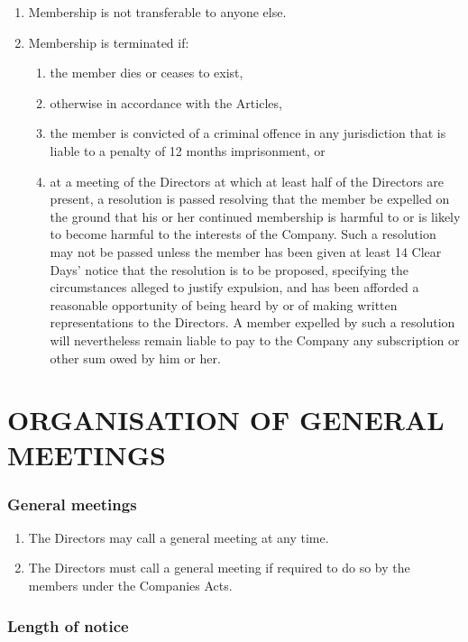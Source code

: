 \documentclass[a4paper,12pt]{article}
\begin{document}
\begin{enumerate}
  \item Membership is not transferable to anyone else.\footnotemark[\ref{membership1}]
  \item Membership is terminated if:
  \begin{enumerate}
    \item the member dies or ceases to exist,\footnotemark[\ref{membership1}]
    \item otherwise in accordance with the Articles,\footnotemark[\ref{membership1}]
    \item the member is convicted of a criminal offence in any jurisdiction that is liable to a penalty of 12 months imprisonment, or
    \item at a meeting of the Directors at which at least half of the Directors are present, a resolution is passed resolving that the member be expelled on the ground that his or her continued membership is harmful to or is likely to become harmful to the interests of the Company. Such a resolution may not be passed unless the member has been given at least 14 Clear Days' notice that the resolution is to be proposed, specifying the circumstances alleged to justify expulsion, and has been afforded a reasonable opportunity of being heard by or of making written representations to the Directors. A member expelled by such a resolution will nevertheless remain liable to pay to the Company any subscription or other sum owed by him or her.
  \end{enumerate}
\end{enumerate}

\part*{ORGANISATION OF GENERAL MEETINGS}

\section{General meetings}

\begin{enumerate}
  \item The Directors may call a general meeting at any time.
  \item The Directors must call a general meeting if required to do so by the members under the Companies Acts.
\end{enumerate}

\section{Length of notice}
\end{document}
